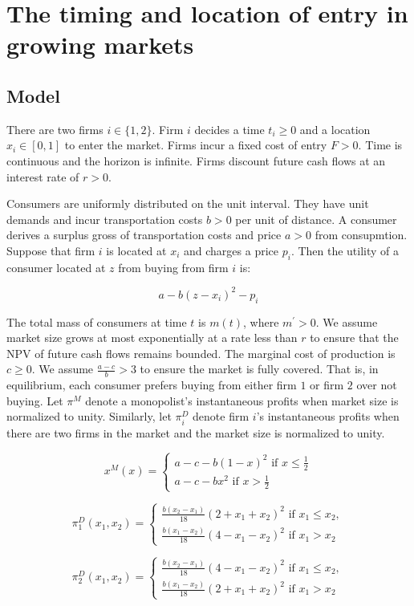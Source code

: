 \chapter{The timing and location of entry in growing markets}

\section{Model}

There are two firms $i \in \{1, 2\}$. Firm $i$ decides a time $t_i \geq 0$ and a location $x_i \in [0, 1]$ to enter the market. Firms incur a fixed cost of entry $F > 0$. Time is continuous and the horizon is infinite. Firms discount future cash flows at an interest rate of $r > 0$.

Consumers are uniformly distributed on the unit interval. They have unit demands and incur transportation costs $b > 0$ per unit of distance. A consumer derives a surplus gross of transportation costs and price $a > 0$ from consupmtion. Suppose that firm $i$ is located at $x_i$ and charges a price $p_i$. Then the utility of a consumer located at $z$ from buying from firm $i$ is:

\begin{equation}
    a - b(z - x_i)^2 - p_i
\end{equation}

The total mass of consumers at time $t$ is $m(t)$, where $m^\prime > 0$. We assume market size grows at most exponentially at a rate less than $r$ to ensure that the NPV of future cash flows remains bounded. The marginal cost of production is $c \geq 0$. We assume $\frac{a - c}{b} > 3$ to ensure the market is fully covered. That is, in equilibrium, each consumer prefers buying from either firm $1$ or firm $2$ over not buying. Let $\pi^M$ denote a monopolist's instantaneous profits when market size is normalized to unity. Similarly, let $\pi_i^D$ denote firm $i$'s instantaneous profits when there are two firms in the market and the market size is normalized to unity.

\begin{equation}
    x^M(x) = \begin{cases}
        a - c - b(1 - x)^2 \text{ if } x \leq \frac{1}{2} \\
        a - c - bx^2 \text{ if } x > \frac{1}{2}
    \end{cases}
\end{equation}

\begin{equation}
    \pi_1^D(x_1, x_2) = \begin{cases}
        \frac{b(x_2 - x_1)}{18} (2 + x_1 + x_2)^2 \text{ if } x_1 \leq x_2, \\
        \frac{b(x_1 - x_2)}{18} (4 - x_1 - x_2)^2 \text{ if } x_1 > x_2
    \end{cases}
\end{equation}

\begin{equation}
    \pi_2^D(x_1, x_2) = \begin{cases}
        \frac{b(x_2 - x_1)}{18} (4 - x_1 - x_2)^2 \text{ if } x_1 \leq x_2, \\
        \frac{b(x_1 - x_2)}{18} (2 + x_1 + x_2)^2 \text{ if } x_1 > x_2
    \end{cases}
\end{equation}